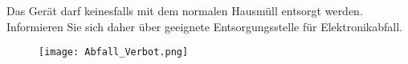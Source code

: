 Das Gerät darf keinesfalls mit dem normalen Hausmüll entsorgt werden. Informieren Sie sich daher über geeignete Entsorgungsstelle für Elektronikabfall.
\\[10mm]
\begin{figure}[h]
	\centering
	\texttt{[image: Abfall\_Verbot.png]}
\end{figure}